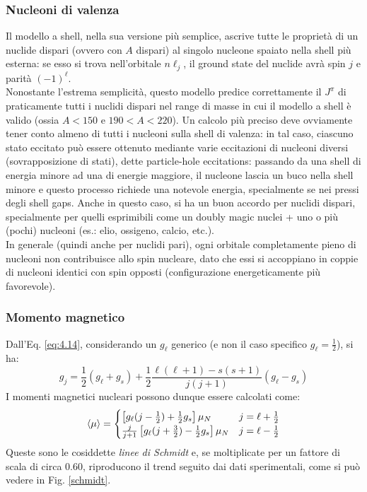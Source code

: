 \subsubsection{Nucleoni di valenza}

Il modello a shell, nella sua versione più semplice, ascrive tutte le proprietà di un nuclide dispari (ovvero con $ A $ dispari) al singolo nucleone spaiato nella shell più esterna: se esso si trova nell'orbitale $ n\ell_j $, il ground state del nuclide avrà spin $ j $ e parità $ (-1)^{\ell} $.\\
Nonostante l'estrema semplicità, questo modello predice correttamente il $ J^{\pi} $ di praticamente tutti i nuclidi dispari nel range di masse in cui il modello a shell è valido (ossia $ A < 150 $ e $ 190 < A < 220 $).
Un calcolo più preciso deve ovviamente tener conto almeno di tutti i nucleoni sulla shell di valenza: in tal caso, ciascuno stato eccitato può essere ottenuto mediante varie eccitazioni di nucleoni diversi (sovrapposizione di stati), dette particle-hole eccitations: passando da una shell di energia minore ad una di energie maggiore, il nucleone lascia un buco nella shell minore e questo processo richiede una notevole energia, specialmente se nei pressi degli shell gaps. Anche in questo caso, si ha un buon accordo per nuclidi dispari, specialmente per quelli esprimibili come un doubly magic nuclei + uno o più (pochi) nucleoni (es.: elio, ossigeno, calcio, etc.).\\
In generale (quindi anche per nuclidi pari), ogni orbitale completamente pieno di nucleoni non contribuisce allo spin nucleare, dato che essi si accoppiano in coppie di nucleoni identici con spin opposti (configurazione energeticamente più favorevole).

\subsubsection{Momento magnetico}

Dall'Eq. \ref{eq:4.14}, considerando un $ g_{\ell} $ generico (e non il caso specifico $ g_{\ell} = \frac{1}{2} $), si ha:
\begin{equation}
	g_j = \frac{1}{2} (g_{\ell} + g_s) + \frac{1}{2} \frac{\ell (\ell + 1) - s (s + 1)}{j (j + 1)} (g_{\ell} - g_s)
	\label{eq:5.7}
\end{equation}
I momenti magnetici nucleari possono dunque essere calcolati come:
\begin{equation}
	\braket{\mu} =
	\begin{cases}
		\left[ g_{\ell} (j - \frac{1}{2}) + \frac{1}{2} g_s \right] \mu_N & j = \ell + \frac{1}{2} \\
		\frac{j}{j + 1} \left[ g_{\ell} (j + \frac{3}{2}) - \frac{1}{2} g_s \right] \mu_N & j = \ell - \frac{1}{2}
	\end{cases}
	\label{eq:5.8}
\end{equation}
Queste sono le cosiddette \textit{linee di Schmidt} e, se moltiplicate per un fattore di scala di circa $ 0.60 $, riproducono il trend seguito dai dati sperimentali, come si può vedere in Fig. \ref{schmidt}.

